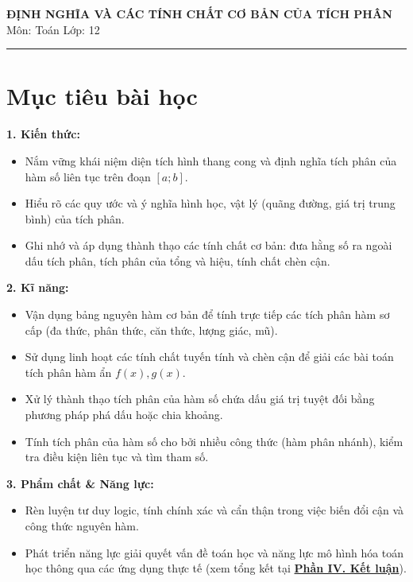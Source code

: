 \documentclass[12pt]{article}
\begin{document}
	
	\begin{center}
		{\LARGE \textbf{ĐỊNH NGHĨA VÀ CÁC TÍNH CHẤT CƠ BẢN CỦA TÍCH PHÂN}}\\[4pt]
		{\large Môn: Toán \quad Lớp: 12}
	\end{center}
	\vspace{4mm}
	\hrule
	\vspace{4mm}
	
	\section*{Mục tiêu bài học}
	
	\textbf{1. Kiến thức:} 
	\begin{itemize}
		\item Nắm vững khái niệm diện tích hình thang cong và định nghĩa tích phân của hàm số liên tục trên đoạn $[a; b]$.
		\item Hiểu rõ các quy ước và ý nghĩa hình học, vật lý (quãng đường, giá trị trung bình) của tích phân.
		\item Ghi nhớ và áp dụng thành thạo các tính chất cơ bản: đưa hằng số ra ngoài dấu tích phân, tích phân của tổng và hiệu, tính chất chèn cận.
	\end{itemize}
	
	\noindent \textbf{2. Kĩ năng:} 
	\begin{itemize}
		\item Vận dụng bảng nguyên hàm cơ bản để tính trực tiếp các tích phân hàm sơ cấp (đa thức, phân thức, căn thức, lượng giác, mũ).
		\item Sử dụng linh hoạt các tính chất tuyến tính và chèn cận để giải các bài toán tích phân hàm ẩn $f(x), g(x)$.
		\item Xử lý thành thạo tích phân của hàm số chứa dấu giá trị tuyệt đối bằng phương pháp phá dấu hoặc chia khoảng.
		\item Tính tích phân của hàm số cho bởi nhiều công thức (hàm phân nhánh), kiểm tra điều kiện liên tục và tìm tham số.
	\end{itemize}
	
	\noindent \textbf{3. Phẩm chất \& Năng lực:}
	\begin{itemize}
		\item Rèn luyện tư duy logic, tính chính xác và cẩn thận trong việc biến đổi cận và công thức nguyên hàm.
		\item Phát triển năng lực giải quyết vấn đề toán học và năng lực mô hình hóa toán học thông qua các ứng dụng thực tế (xem tổng kết tại \hyperref[sec:ketluan]{\textbf{Phần IV. Kết luận}}).
	\end{itemize}
	
\end{document}
